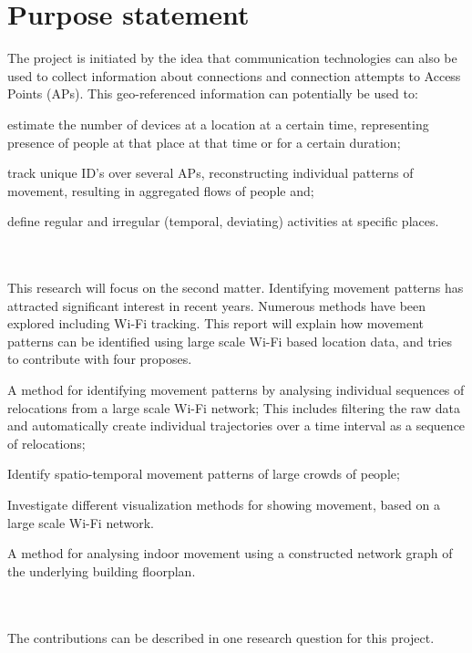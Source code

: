 \section{Purpose statement}\label{purpstate}
The project is initiated by the idea that communication technologies can also be used to collect information about connections and connection attempts to Access Points (APs). This geo-referenced information can potentially be used to: \begin {enumerate*} [label=\itshape\arabic*\upshape),font={\color{red!0!black}\bfseries}] \item estimate the number of devices at a location at a certain time, representing presence of people at that place at that time or for a certain duration; \item track unique ID’s over several APs, reconstructing individual patterns of movement, resulting in
aggregated flows of people and; \item define regular and irregular (temporal, deviating) activities at specific places.\end{enumerate*}\\\\
This research will focus on the second matter. Identifying movement patterns has attracted significant interest in recent years. Numerous methods have been explored including Wi-Fi tracking. This report will explain how movement patterns can be identified using large scale Wi-Fi based location data, and tries to contribute with four proposes.
\begin {enumerate*} [label=\itshape\arabic*\upshape),font={\color{red!0!black}\bfseries}] \item A method for identifying movement patterns by analysing individual sequences of relocations from a large scale Wi-Fi network; This includes filtering the raw data and automatically create individual trajectories over a time interval as a sequence of relocations; \item Identify spatio-temporal movement patterns of large crowds of people; \item Investigate different visualization methods for showing movement, based on a large scale Wi-Fi network. \item A method for analysing indoor movement using a constructed network graph of the underlying building floorplan.\end {enumerate*}\\\\
The contributions can be described in one research question for this project.
